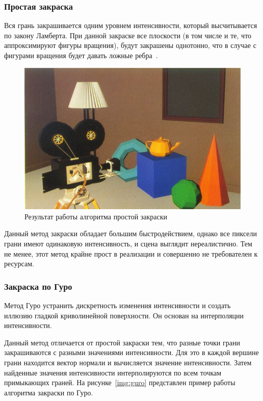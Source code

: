 \subsubsection{Простая закраска}

Вся грань закрашивается одним уровнем интенсивности, который высчитывается по закону Ламберта. При данной закраске все плоскости (в том числе и те, что аппроксимируют фигуры вращения), будут закрашены однотонно, что в случае с фигурами вращения будет давать ложные ребра~\cite{roders}.

\begin{figure}[h]
	\centering
	\includegraphics[height=0.35\textheight]{img/simple.png}
	\caption{Результат работы алгоритма простой закраски}
	\label{img:simple-draw}
\end{figure}

Данный метод закраски обладает большим быстродействием, однако все пиксели грани имеют одинаковую интенсивность, и сцена выглядит нереалистично. 
Тем не менее, этот метод крайне прост в реализации и совершенно не требователен к ресурсам.

\subsubsection{Закраска по Гуро}

Метод Гуро устранить дискретность изменения интенсивности и создать иллюзию гладкой криволинейной поверхности.
Он основан на интерполяции интенсивности.

Данный метод отличается от простой закраски тем, что разные точки грани закрашиваются с разными значениями интенсивности.
Для это в каждой вершине грани находится вектор нормали и вычисляется значение интенсивности.
Затем найденные значения интенсивности интерполируются по всем точкам примыкающих граней.
На рисунке~\ref{img:guro} представлен пример работы алгоритма закраски по Гуро.

